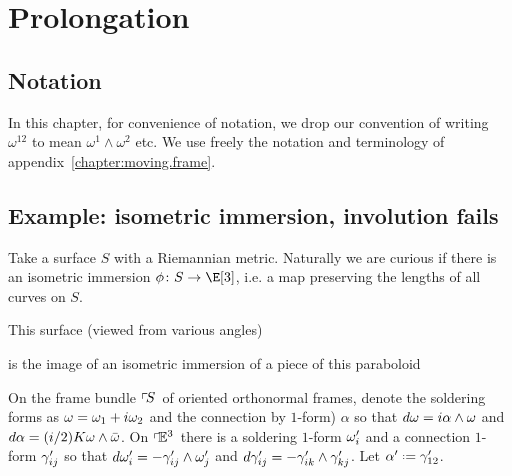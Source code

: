 \chapter{Prolongation}\label{chapter:prolongation}
%
\section{Notation}In this chapter, for convenience of notation, we drop our convention of writing \(\omega^{12}\) to mean \(\omega^1\wedge\omega^2\) etc.
We use freely the notation and terminology of appendix~\ref{chapter:moving.frame}. 
\section{Example: isometric immersion, involution fails}
Take a surface \(S\) with a Riemannian metric.
Naturally we are curious if there is an isometric immersion \(\phi \colon S \to \E[3]\), i.e. a map preserving the lengths of all curves on \(S\).
\begin{example}This surface (viewed from various angles)
\begin{center}
\end{center}
is the image of an isometric immersion of a piece of this paraboloid
\begin{center}
\end{center}
\end{example}
On the frame bundle \(\left\ulcorner\!S\right.\) of oriented orthonormal frames, denote the soldering forms as \(\omega=\omega_1+i\omega_2\) and the connection by \(1\)-form) \(\alpha\) so that \(d\omega=i\alpha \wedge \omega\) and \(d\alpha=(i/2)K\omega \wedge \bar{\omega}\).
On \(\left\ulcorner\!\mathbb{E}^{3}\right.\) there is a soldering \(1\)-form \(\omega'_i\) and a connection \(1\)-form \(\gamma'_{ij}\) so that \(d\omega'_i = -\gamma'_{ij} \wedge \omega'_j\) and \(d\gamma'_{ij} = -\gamma'_{ik} \wedge \gamma'_{kj}\).
Let \(\otalpha\defeq\qc_{12}\).

